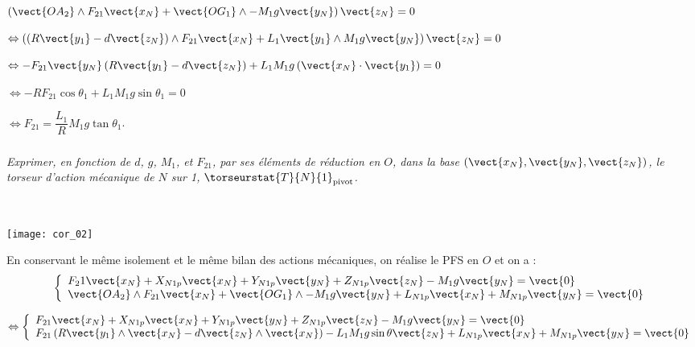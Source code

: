 \begin{multicols}{2}
\begin{corrige}
\noindent
$\left(\vect{OA_2}\wedge F_{21}\vect{x_N}  + 
\vect{OG_1}\wedge -M_1g\vect{y_N} \right) \vect{z_N} = {0}$ 

\noindent
$\Leftrightarrow  \left(\left( R\vect{y_1} - d\vect{z_N}\right)\wedge F_{21}\vect{x_N}  
+L_1\vect{y_1}\wedge M_1g\vect{y_N} \right) \vect{z_N} = {0}$

\noindent
$\Leftrightarrow 
-F_{21}\vect{y_N}\left( R\vect{y_1} - d\vect{z_N}\right)  
+L_1 M_1g\left(\vect{x_N} \cdot \vect{y_1}\right) = {0}$
\noindent

\noindent
$\Leftrightarrow 
-RF_{21}\cos \theta_1
+L_1 M_1g\sin\theta_1 = {0}$

\noindent
$\Leftrightarrow F_{21}=\dfrac{L_1}{R} M_1g\tan\theta_1 $.

\end{corrige}
\else
\fi

\subparagraph{}\textit{Exprimer, en fonction de $d$, $g$,
$M_1$, et $F_{21}$, par ses éléments de réduction en $O$, dans la base $\left( \vect{x_N} , \vect{y_N} , \vect{z_N} \right)$, le torseur d’action mécanique de $N$
sur 1, $\torseurstat{T}{N}{1}_{\text{pivot}}$.}
\ifprof
\begin{corrige} ~\\

\begin{center}
\texttt{[image: cor\_02]}
\end{center}


En conservant le même isolement et le même bilan des actions mécaniques, on réalise le PFS en $O$ et on a : 
$$
\left\{
\begin{array}{l}
F_21\vect{x_N}+X_{N1p}\vect{x_N}+Y_{N1p}\vect{y_N}+Z_{N1p}\vect{z_N} - M_1g\vect{y_N} = \vect{0}\\
\vect{OA_2}\wedge F_{21}\vect{x_N}  + 
\vect{OG_1}\wedge -M_1g\vect{y_N}  +L_{N1p}\vect{x_N}+M_{N1p}\vect{y_N}= \vect{0} \\
\end{array}
\right.
$$



$$ \Leftrightarrow
\left\{
\begin{array}{l}
F_{21}\vect{x_N}+X_{N1p}\vect{x_N}+Y_{N1p}\vect{y_N}+Z_{N1p}\vect{z_N} - M_1g\vect{y_N} = \vect{0}\\
 F_{21}\left( R\vect{y_1} \wedge \vect{x_N}- d\vect{z_N}\wedge \vect{x_N}\right)  
-L_1M_1g \sin \theta \vect{z_N} +L_{N1p}\vect{x_N}+M_{N1p}\vect{y_N} = \vect{0} \\
\end{array}
\right.
$$


\end{corrige}
\end{multicols}
